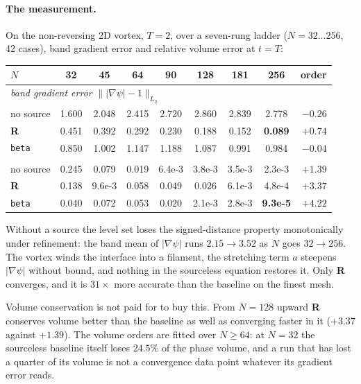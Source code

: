 \documentclass[preprint,3p,11pt]{elsarticle}
\newcommand{\psilev}{\psi}
\newcommand{\gradpsi}{\lvert\nabla\psilev\rvert}
\begin{document}
\paragraph{The measurement.}
On the non-reversing 2D vortex, $T=2$, over a seven-rung ladder
($N = 32\ldots256$, 42 cases), band gradient error and relative volume error at
$t=T$:
\begin{center}
\begin{tabular}{lcccccccr}
\toprule
$N$ & 32 & 45 & 64 & 90 & 128 & 181 & 256 & order \\
\midrule
\multicolumn{9}{l}{\emph{band gradient error} $\bigl\|\gradpsi-1\bigr\|_{L_2}$}\\
no source     & 1.600 & 2.048 & 2.415 & 2.720 & 2.860 & 2.839 & 2.778 & $-0.26$ \\
\textbf{R}    & 0.451 & 0.392 & 0.292 & 0.230 & 0.188 & 0.152 & \textbf{0.089} & $\mathbf{+0.74}$ \\
\texttt{beta} & 0.850 & 1.002 & 1.147 & 1.188 & 1.087 & 0.991 & 0.984 & $-0.04$ \\
\addlinespace
\multicolumn{9}{l}{\emph{relative volume error}}\\
no source     & 0.245 & 0.079 & 0.019 & 6.4e{-3} & 3.8e{-3} & 3.5e{-3} & 2.3e{-3} & $+1.39$ \\
\textbf{R}    & 0.138 & 9.6e{-3} & 0.058 & 0.049 & 0.026 & 6.1e{-3} & 4.8e{-4} & $+3.37$ \\
\texttt{beta} & 0.040 & 0.072 & 0.053 & 0.020 & 2.1e{-3} & 2.8e{-3} & \textbf{9.3e{-5}} & $+4.22$ \\
\bottomrule
\end{tabular}
\end{center}
Without a source the level set loses the signed-distance property monotonically
under refinement: the band mean of $\gradpsi$ runs $2.15 \to 3.52$ as $N$ goes
$32 \to 256$. The vortex winds the interface into a filament, the stretching
term $a$ steepens $\gradpsi$ without bound, and nothing in the sourceless
equation restores it. Only \textbf{R} converges, and it is $31\times$ more
accurate than the baseline on the finest mesh.

Volume conservation is not paid for to buy this. From $N=128$ upward
\textbf{R} conserves volume better than the baseline as well as converging
faster in it ($+3.37$ against $+1.39$). The volume orders are fitted over
$N \ge 64$: at $N=32$ the sourceless baseline itself loses $24.5\%$ of the
phase volume, and a run that has lost a quarter of its volume is not a
convergence data point whatever its gradient error reads.
\end{document}

